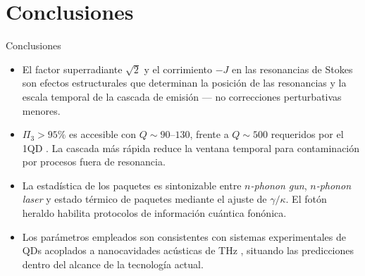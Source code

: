 \documentclass[
11pt,notheorems,hyperref={pdfauthor=whatever}
]{beamer}
\begin{document}
\section{Conclusiones}
\begin{frame}{Conclusiones}
	
	\begin{itemize}\setlength{\itemsep}{8pt}
		
		\item El factor superradiante $\sqrt{2}$ y el corrimiento $-J$ en las
		resonancias de Stokes son efectos estructurales que determinan
		la posición de las resonancias y la escala temporal de la cascada
		de emisión — no correcciones perturbativas menores.
		
		\item $\Pi_3 > 95\%$ es accesible con $Q \sim 90$--$130$, frente a
		$Q \sim 500$ requeridos por el 1QD \cite{bin2020}. La cascada
		más rápida reduce la ventana temporal para contaminación por
		procesos fuera de resonancia.
		
		\item La estadística de los paquetes es sintonizable entre
		\textit{$n$-phonon gun}, \textit{$n$-phonon laser} y estado
		térmico de paquetes mediante el ajuste de $\gamma/\kappa$.
		El fotón heraldo habilita protocolos de información cuántica
		fonónica.
		
		\item Los parámetros empleados son consistentes con sistemas
		experimentales de QDs acoplados a nanocavidades acústicas de THz
		\cite{weig2004,rozas2009}, situando las predicciones dentro del
		alcance de la tecnología actual.
		
	\end{itemize}
	
\end{frame}

\end{document}
